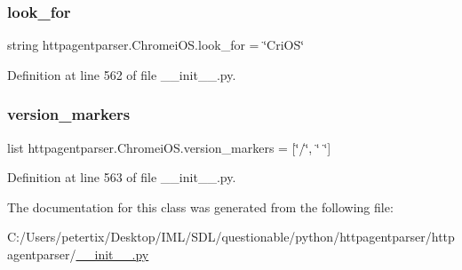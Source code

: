 \subsubsection{\texorpdfstring{look\+\_\+for}{look\_for}}
{\footnotesize\ttfamily string httpagentparser.\+Chromei\+O\+S.\+look\+\_\+for = \char`\"{}Cri\+OS\char`\"{}\hspace{0.3cm}{\ttfamily [static]}}



Definition at line 562 of file \+\_\+\+\_\+init\+\_\+\+\_\+.\+py.

\hypertarget{classhttpagentparser_1_1_chromei_o_s_a3be0f1cc89dd3a935d5583535cbe49ea}{}\label{classhttpagentparser_1_1_chromei_o_s_a3be0f1cc89dd3a935d5583535cbe49ea} 
\subsubsection{\texorpdfstring{version\+\_\+markers}{version\_markers}}
{\footnotesize\ttfamily list httpagentparser.\+Chromei\+O\+S.\+version\+\_\+markers = \mbox{[}\char`\"{}/\char`\"{}, \char`\"{} \char`\"{}\mbox{]}\hspace{0.3cm}{\ttfamily [static]}}



Definition at line 563 of file \+\_\+\+\_\+init\+\_\+\+\_\+.\+py.



The documentation for this class was generated from the following file\+:\begin{DoxyCompactItemize}
\item 
C\+:/\+Users/petertix/\+Desktop/\+I\+M\+L/\+S\+D\+L/questionable/python/httpagentparser/httpagentparser/\hyperlink{____init_____8py}{\+\_\+\+\_\+init\+\_\+\+\_\+.\+py}\end{DoxyCompactItemize}

